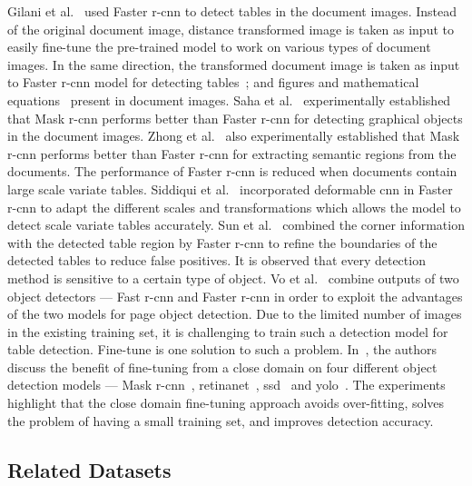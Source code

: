 \documentclass[a4paper,conference]{IEEEtran}
\begin{document}
Gilani et al.~\cite{gilani2017table} used Faster {\sc r-cnn} to detect tables in the document images. Instead of the original document image, distance transformed image is taken as input to easily fine-tune the pre-trained model to work on various types of document images. In the same direction, the transformed document image is taken as input to Faster {\sc r-cnn} model for detecting tables~\cite{arif2018table}; and figures and mathematical equations~\cite{younas2019ffd} present in document images. Saha et al.~\cite{saha2019graphical} experimentally established that Mask {\sc r-cnn} performs better than Faster {\sc r-cnn} for detecting graphical objects in the document images. Zhong et al.~\cite{zhong2019publaynet} also experimentally established that Mask {\sc r-cnn} performs better than Faster {\sc r-cnn} for extracting semantic regions from the documents. The performance of Faster {\sc r-cnn} is reduced when documents contain large scale variate tables. Siddiqui et al.~\cite{siddiqui2018decnt} incorporated deformable {\sc cnn} in Faster {\sc r-cnn} to adapt the different scales and transformations which allows the model to detect scale variate tables accurately. Sun et al.~\cite{sun2019faster} combined the corner information with the detected table region by Faster {\sc r-cnn} to refine the boundaries of the detected tables to reduce false positives. 
It is observed that every detection method is sensitive to a certain type of object. Vo et al.~\cite{vo2018ensemble} combine outputs of two object detectors --- Fast {\sc r-cnn} and Faster {\sc r-cnn} in order to exploit the advantages of the two models for page object detection. Due to the limited number of images in the existing training set, it is challenging to train such a detection model for table detection. Fine-tune is one solution to such a problem. In~\cite{casado2019benefits}, the authors discuss the benefit of fine-tuning from a close domain on four different object detection models --- Mask {\sc r-cnn}~\cite{he2017mask}, {\sc r}etina{\sc n}et~\cite{lin2017focal}, {\sc ssd}~\cite{liu2016ssd} and {\sc yolo}~\cite{redmon2016you}. The experiments highlight that the close domain fine-tuning approach avoids over-fitting, solves the problem of having a small training set, and improves detection accuracy.

\subsection{Related Datasets}
\end{document}
